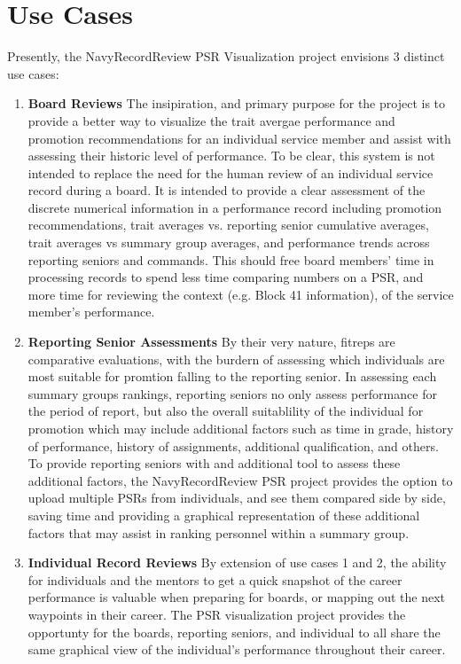 \documentclass[UTF8]{article}
\begin{document}
\section{Use Cases}
Presently, the NavyRecordReview PSR Visualization project envisions 3 distinct use cases:
\begin{enumerate}
\item \textbf{Board Reviews} The insipiration, and primary purpose for the project is to provide a better way to visualize the trait avergae performance and promotion recommendations for an individual service member and assist with assessing their historic level of performance. To be clear, this system is not intended to replace the need for the human review of an individual service record during a board. It is intended to provide a clear assessment of the discrete numerical information in a performance record including promotion recommendations, trait averages vs. reporting senior cumulative averages, trait averages vs summary group averages, and performance trends across reporting seniors and commands. This should free board members' time in processing records to spend less time comparing numbers on a PSR, and more time for reviewing the context (e.g. Block 41 information), of the service member's performance.
\item \textbf{Reporting Senior Assessments} By their very nature, fitreps are comparative evaluations, with the burdern of assessing which individuals are most suitable for promtion falling to the reporting senior. In assessing each summary groups rankings, reporting seniors no only assess performance for the period of report, but also the overall suitablility of the individual for promotion which may include additional factors such as time in grade, history of performance, history of assignments, additional qualification, and others. To provide reporting seniors with and additional tool to assess these additional factors, the NavyRecordReview PSR project provides the option to upload multiple PSRs from individuals, and see them compared side by side, saving time and providing a graphical representation of these additional factors that may assist in ranking personnel within a summary group.
\item \textbf{Individual Record Reviews} By extension of use cases 1 and 2, the ability for individuals and the mentors to get a quick snapshot of the career performance is valuable when preparing for boards, or mapping out the next waypoints in their career. The PSR visualization project provides the opportunty for the boards, reporting seniors, and individual to all share the same graphical view of the individual's performance throughout their career.
\end{enumerate}
\end{document}
